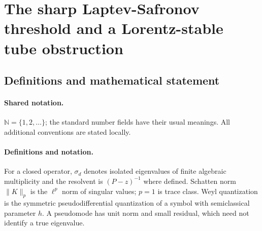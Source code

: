\documentclass[11pt]{article}
\begin{document}
\section{The sharp Laptev-Safronov threshold and a Lorentz-stable tube obstruction}\label{statement}

\subsection{Definitions and mathematical statement}

\paragraph{Shared notation.}$\mathbb N=\{1,2,\ldots\}$; the standard number fields have their usual meanings. All additional conventions are stated locally.


\paragraph{Definitions and notation.}For a closed operator, $\sigma_d$ denotes isolated eigenvalues of finite algebraic multiplicity and the resolvent is $(P-z)^{-1}$ where defined. Schatten norm $\|K\|_p$ is the $\ell^p$ norm of singular values; $p=1$ is trace class. Weyl quantization is the symmetric pseudodifferential quantization of a symbol with semiclassical parameter $h$. A pseudomode has unit norm and small residual, which need not identify a true eigenvalue.
\end{document}
